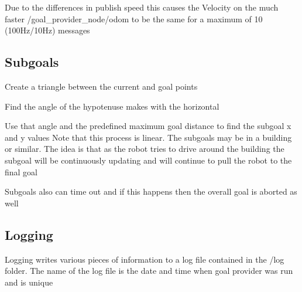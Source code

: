 \-Due to the differences in publish speed this causes the \-Velocity on the much faster /goal\-\_\-provider\-\_\-node/odom to be the same for a maximum of 10 (100\-Hz/10\-Hz) messages\hypertarget{index_subgoal}{}\subsection{\-Subgoals}\label{index_subgoal}

\begin{DoxyItemize}
\item \-Create a triangle between the current and goal points
\item \-Find the angle of the hypotenuse makes with the horizontal
\item \-Use that angle and the predefined maximum goal distance to find the subgoal x and y values \-Note that this process is linear. \-The subgoals may be in a building or similar. \-The idea is that as the robot tries to drive around the building the subgoal will be continuously updating and will continue to pull the robot to the final goal
\end{DoxyItemize}

\-Subgoals also can time out and if this happens then the overall goal is aborted as well\hypertarget{index_logging}{}\subsection{\-Logging}\label{index_logging}
\-Logging writes various pieces of information to a log file contained in the /log folder. \-The name of the log file is the date and time when goal provider was run and is unique 